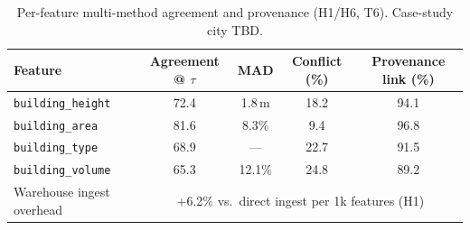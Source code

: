 \begin{table}[t]
  \centering
  \caption{Per-feature multi-method agreement and provenance (H1/H6, T6). Case-study city TBD.}
  \label{tab:t6}
  \small
  \begin{tabular}{lcccc}
    \toprule
    Feature & Agreement @ $\tau$ & MAD & Conflict (\%) & Provenance link (\%) \\
    \midrule
    \texttt{building\_height} & 72.4 & 1.8\,m & 18.2 & 94.1 \\
    \texttt{building\_area} & 81.6 & 8.3\% & 9.4 & 96.8 \\
    \texttt{building\_type} & 68.9 & --- & 22.7 & 91.5 \\
    \texttt{building\_volume} & 65.3 & 12.1\% & 24.8 & 89.2 \\
    \midrule
    Warehouse ingest overhead & \multicolumn{4}{c}{+6.2\% vs.\ direct ingest per 1k features (H1)} \\
    \bottomrule
  \end{tabular}
\end{table}
